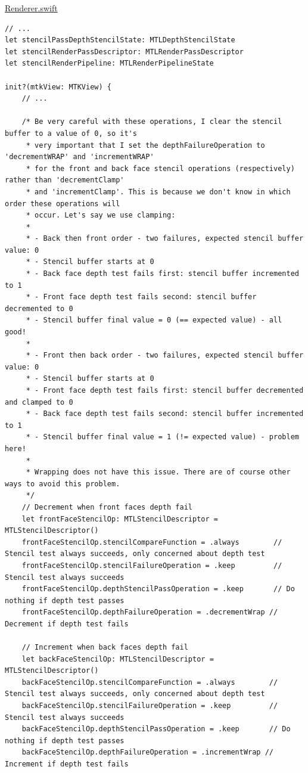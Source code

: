 \documentclass[11pt]{article}
\begin{document}
\uline{Renderer.swift}
\begin{verbatim}
// ...
let stencilPassDepthStencilState: MTLDepthStencilState
let stencilRenderPassDescriptor: MTLRenderPassDescriptor
let stencilRenderPipeline: MTLRenderPipelineState

init?(mtkView: MTKView) {
    // ...

    /* Be very careful with these operations, I clear the stencil buffer to a value of 0, so it's
     * very important that I set the depthFailureOperation to 'decrementWRAP' and 'incrementWRAP'
     * for the front and back face stencil operations (respectively) rather than 'decrementClamp'
     * and 'incrementClamp'. This is because we don't know in which order these operations will
     * occur. Let's say we use clamping:
     *
     * - Back then front order - two failures, expected stencil buffer value: 0
     * - Stencil buffer starts at 0
     * - Back face depth test fails first: stencil buffer incremented to 1
     * - Front face depth test fails second: stencil buffer decremented to 0
     * - Stencil buffer final value = 0 (== expected value) - all good!
     *
     * - Front then back order - two failures, expected stencil buffer value: 0
     * - Stencil buffer starts at 0
     * - Front face depth test fails first: stencil buffer decremented and clamped to 0
     * - Back face depth test fails second: stencil buffer incremented to 1
     * - Stencil buffer final value = 1 (!= expected value) - problem here!
     *
     * Wrapping does not have this issue. There are of course other ways to avoid this problem.
     */
    // Decrement when front faces depth fail
    let frontFaceStencilOp: MTLStencilDescriptor = MTLStencilDescriptor()
    frontFaceStencilOp.stencilCompareFunction = .always        // Stencil test always succeeds, only concerned about depth test
    frontFaceStencilOp.stencilFailureOperation = .keep         // Stencil test always succeeds
    frontFaceStencilOp.depthStencilPassOperation = .keep       // Do nothing if depth test passes
    frontFaceStencilOp.depthFailureOperation = .decrementWrap // Decrement if depth test fails

    // Increment when back faces depth fail
    let backFaceStencilOp: MTLStencilDescriptor = MTLStencilDescriptor()
    backFaceStencilOp.stencilCompareFunction = .always        // Stencil test always succeeds, only concerned about depth test
    backFaceStencilOp.stencilFailureOperation = .keep         // Stencil test always succeeds
    backFaceStencilOp.depthStencilPassOperation = .keep       // Do nothing if depth test passes
    backFaceStencilOp.depthFailureOperation = .incrementWrap // Increment if depth test fails


\end{verbatim}
\end{document}

